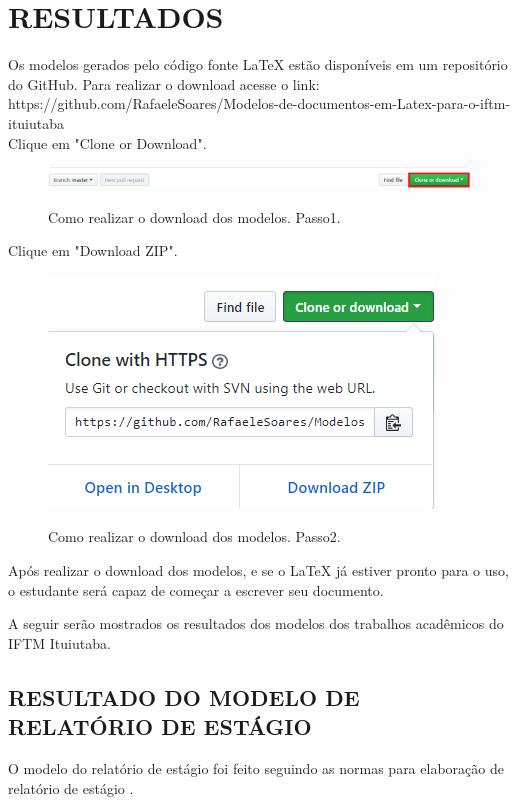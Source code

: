 \newpage
\section{RESULTADOS}
Os modelos gerados pelo código fonte LaTeX estão disponíveis em um repositório do GitHub. Para realizar o download acesse o link:\\https://github.com/RafaeleSoares/Modelos-de-documentos-em-Latex-para-o-iftm-ituiutaba\\

Clique em "Clone or Download".
\begin{figure}[h]
	\centering
	\includegraphics[scale=0.5]{imagens/git/git1.png}\\
	\caption{Como realizar o download dos modelos. Passo1.}
	\label{git1}
\end{figure}

Clique em "Download ZIP".
\begin{figure}[h]
	\centering
	\includegraphics[scale=0.5]{imagens/git/git2.png}\\
	\caption{Como realizar o download dos modelos. Passo2.}
	\label{git2}
\end{figure}

Após realizar o download dos modelos, e se o LaTeX já estiver pronto para o uso, o estudante será capaz de começar a escrever seu documento.

A seguir serão mostrados os resultados dos modelos dos trabalhos acadêmicos do IFTM Ituiutaba.

\subsection{RESULTADO DO MODELO DE RELATÓRIO DE ESTÁGIO}
O modelo do relatório de estágio foi feito seguindo as normas para elaboração de relatório de estágio \cite{manualEstagio}.

